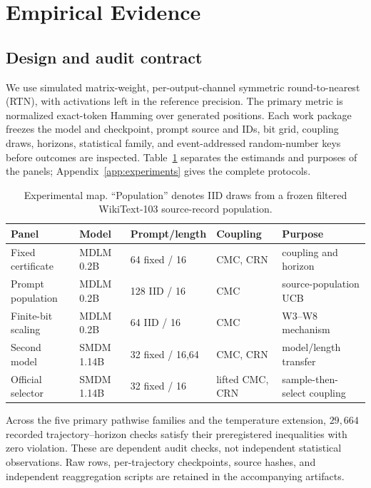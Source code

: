 \section{Empirical Evidence}
\label{sec:experiments}

\subsection{Design and audit contract}
We use simulated matrix-weight, per-output-channel symmetric round-to-nearest (RTN), with activations left in the reference precision. The primary metric is normalized exact-token Hamming over generated positions. Each work package freezes the model and checkpoint, prompt source and IDs, bit grid, coupling draws, horizons, statistical family, and event-addressed random-number keys before outcomes are inspected. Table~\ref{tab:design} separates the estimands and purposes of the panels; Appendix~\ref{app:experiments} gives the complete protocols.

\begin{table}[t]
\caption{Experimental map. ``Population'' denotes IID draws from a frozen filtered WikiText-103 source-record population.}
\label{tab:design}
\centering\footnotesize
\setlength{\tabcolsep}{2pt}
\begin{tabular}{@{}p{.18\linewidth}p{.11\linewidth}p{.16\linewidth}p{.17\linewidth}p{.23\linewidth}@{}}
\toprule
Panel & Model & Prompt/length & Coupling & Purpose \\
\midrule
Fixed certificate & MDLM 0.2B & 64 fixed / 16 & CMC, CRN & coupling and horizon \\
Prompt population & MDLM 0.2B & 128 IID / 16 & CMC & source-population UCB \\
Finite-bit scaling & MDLM 0.2B & 64 IID / 16 & CMC & W3--W8 mechanism \\
Second model & SMDM 1.14B & 32 fixed / 16,64 & CMC, CRN & model/length transfer \\
Official selector & SMDM 1.14B & 32 fixed / 16 & lifted CMC, CRN & sample-then-select coupling \\
\bottomrule
\end{tabular}
\end{table}

Across the five primary pathwise families and the temperature extension, $29{,}664$ recorded trajectory--horizon checks satisfy their preregistered inequalities with zero violation. These are dependent audit checks, not independent statistical observations. Raw rows, per-trajectory checkpoints, source hashes, and independent reaggregation scripts are retained in the accompanying artifacts.


